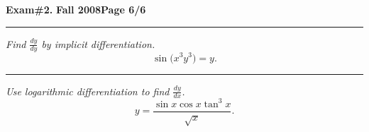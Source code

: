 \documentclass[12pt]{article}
\begin{document}
\hfill{\large\bf Exam\#2.}\hfill{\large\bf
  Fall 2008}\hfill{\large\bf Page 6/6}\hrule

\bigskip
{\problem[10 pts] \em Find $\displaystyle{\frac{dy}{dy}}$ by implicit differentiation.}
\begin{equation*}
\sin \big( x^3 y^3 \big) = y.
\end{equation*}
\vspace{6cm}
\begin{flushright}
\end{flushright}
\hrule
{\problem[10 pts] \em Use logarithmic differentiation to find $\displaystyle{\frac{dy}{dx}}$.}
\begin{equation*}
y = \frac{\sin x \cos x \tan^3 x}{\sqrt{x}}.
\end{equation*}
\vspace{4cm}
\begin{flushright}
\end{flushright}
\end{document}

